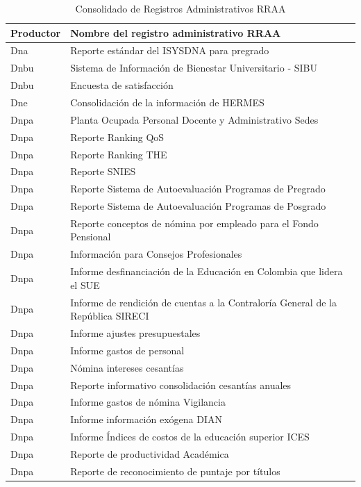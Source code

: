 \documentclass[
]{book}
\begin{document}
\begin{table}

\caption{\label{tab:unnamed-chunk-4}Consolidado de Registros Administrativos RRAA}
\centering
\begin{tabular}[t]{l|l}
\hline
Productor & Nombre del registro administrativo RRAA\\
\hline
Dna & Reporte estándar del ISYSDNA para pregrado\\
\hline
Dnbu & Sistema de Información de Bienestar Universitario - SIBU\\
\hline
Dnbu & Encuesta de satisfacción\\
\hline
Dne & Consolidación de la información de HERMES\\
\hline
Dnpa & Planta Ocupada Personal Docente y Administrativo Sedes\\
\hline
Dnpa & Reporte Ranking QoS\\
\hline
Dnpa & Reporte Ranking THE\\
\hline
Dnpa & Reporte SNIES\\
\hline
Dnpa & Reporte Sistema de Autoevaluación Programas de Pregrado\\
\hline
Dnpa & Reporte Sistema de Autoevaluación Programas de Posgrado\\
\hline
Dnpa & Reporte conceptos de nómina por empleado para el Fondo Pensional\\
\hline
Dnpa & Información para Consejos Profesionales\\
\hline
Dnpa & Informe desfinanciación de la Educación en Colombia que lidera el SUE\\
\hline
Dnpa & Informe de rendición de cuentas a la Contraloría General de la República SIRECI\\
\hline
Dnpa & Informe ajustes presupuestales\\
\hline
Dnpa & Informe gastos de personal\\
\hline
Dnpa & Nómina intereses cesantías\\
\hline
Dnpa & Reporte informativo consolidación cesantías anuales\\
\hline
Dnpa & Informe gastos de nómina Vigilancia\\
\hline
Dnpa & Informe información exógena DIAN\\
\hline
Dnpa & Informe Índices de costos de la educación superior ICES\\
\hline
Dnpa & Reporte de productividad Académica\\
\hline
Dnpa & Reporte de reconocimiento de puntaje por títulos\\

\end{tabular}
\end{table}
\end{document}
